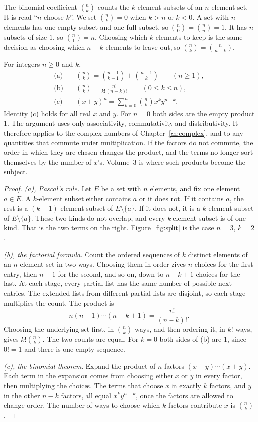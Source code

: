 The binomial coefficient $\binom nk$ counts the $k$-element subsets of an $n$-element set. It is read ``$n$ choose $k$''. We set $\binom nk=0$ when $k>n$ or $k<0$. A set with $n$ elements has one empty subset and one full subset, so $\binom n0=\binom nn=1$. It has $n$ subsets of size $1$, so $\binom n1=n$. Choosing which $k$ elements to keep is the same decision as choosing which $n-k$ elements to leave out, so $\binom nk=\binom n{n-k}$.

\begin{proposition}\label{prop:binom}
For integers $n\ge0$ and $k$,
\begin{align*}
\text{(a)}\quad &\binom nk=\binom{n-1}{k-1}+\binom{n-1}{k}\qquad(n\ge1),\\
\text{(b)}\quad &\binom nk=\frac{n!}{k!\,(n-k)!}\qquad(0\le k\le n),\\
\text{(c)}\quad &(x+y)^n=\sum_{k=0}^n\binom nk x^ky^{n-k}.
\end{align*}
Identity (c) holds for all real $x$ and $y$. For $n=0$ both sides are the empty product $1$. The argument uses only associativity, commutativity and distributivity. It therefore applies to the complex numbers of Chapter~\ref{ch:complex}, and to any quantities that commute under multiplication. If the factors do not commute, the order in which they are chosen changes the product, and the terms no longer sort themselves by the number of $x$'s. Volume~3 is where such products become the subject.
\end{proposition}
\begin{proof}
\emph{(a), Pascal's rule.} Let $E$ be a set with $n$ elements, and fix one element $a\in E$. A $k$-element subset either contains $a$ or it does not. If it contains $a$, the rest is a $(k-1)$-element subset of $E\setminus\{a\}$. If it does not, it is a $k$-element subset of $E\setminus\{a\}$. These two kinds do not overlap, and every $k$-element subset is of one kind. That is the two terms on the right. Figure~\ref{fig:split} is the case $n=3$, $k=2$.

\emph{(b), the factorial formula.} Count the ordered sequences of $k$ distinct elements of an $n$-element set in two ways. Choosing them in order gives $n$ choices for the first entry, then $n-1$ for the second, and so on, down to $n-k+1$ choices for the last. At each stage, every partial list has the same number of possible next entries. The extended lists from different partial lists are disjoint, so each stage multiplies the count. The product is
\[
n(n-1)\cdots(n-k+1)=\frac{n!}{(n-k)!}.
\]
Choosing the underlying set first, in $\binom nk$ ways, and then ordering it, in $k!$ ways, gives $k!\binom nk$. The two counts are equal. For $k=0$ both sides of (b) are $1$, since $0!=1$ and there is one empty sequence.

\emph{(c), the binomial theorem.} Expand the product of $n$ factors $(x+y)\cdots(x+y)$. Each term in the expansion comes from choosing either $x$ or $y$ in every factor, then multiplying the choices. The terms that choose $x$ in exactly $k$ factors, and $y$ in the other $n-k$ factors, all equal $x^ky^{n-k}$, once the factors are allowed to change order. The number of ways to choose which $k$ factors contribute $x$ is $\binom nk$.
\end{proof}

